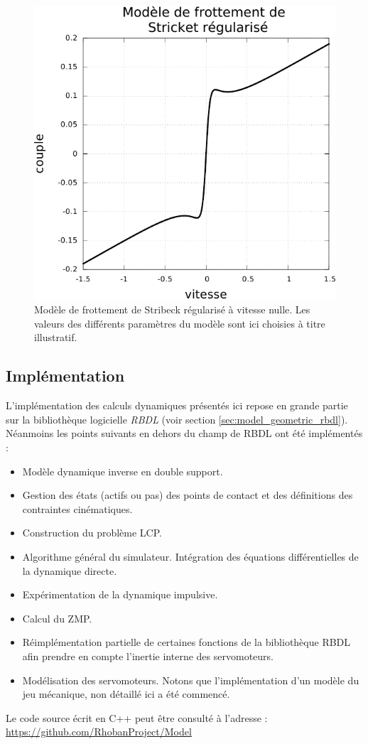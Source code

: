 \begin{figure}[htb]
    \begin{center}
        \includegraphics[type=pdf,ext=.pdf,read=.pdf,width=0.5\linewidth]{../plot/friction_model}
        \caption{\label{fig:friction_model}
            Modèle de frottement de Stribeck régularisé à vitesse nulle.
            Les valeurs des différents paramètres du modèle sont ici 
            choisies à titre illustratif.}
    \end{center}
\end{figure}

\subsection{Implémentation}

L'implémentation des calculs dynamiques 
présentés ici repose en grande partie sur la bibliothèque 
logicielle \textit{RBDL} (voir section \ref{sec:model_geometric_rbdl}).
Néanmoins les points suivants en dehors du champ de RBDL
ont été implémentés :
\begin{itemize}
    \item Modèle dynamique inverse en double support.
    \item Gestion des états (actifs ou pas) des points de contact
        et des définitions des contraintes cinématiques.
    \item Construction du problème LCP.
    \item Algorithme général du simulateur. 
        Intégration des équations différentielles de
        la dynamique directe.
    \item Expérimentation de la dynamique impulsive.
    \item Calcul du ZMP.
    \item Réimplémentation partielle de certaines fonctions de
        la bibliothèque RBDL afin prendre en compte l'inertie interne des servomoteurs.
    \item Modélisation des servomoteurs.
        Notons que l'implémentation d'un modèle du jeu mécanique,
        non détaillé ici a été commencé.
\end{itemize}
Le code source écrit en C++ peut être consulté à l'adresse :\\
\url{https://github.com/RhobanProject/Model}\\

